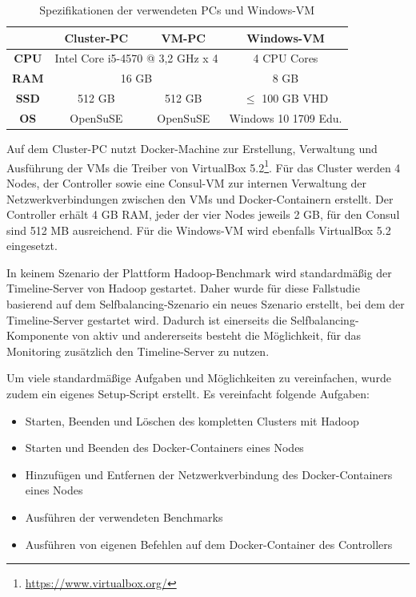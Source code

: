 \begin{table}
    \centering
    \begin{tabular}{|c|c|c|c|}
    	\hline
    	 \textbf{}   & \textbf{Cluster-PC} &         \textbf{VM-PC}          & \textbf{Windows-VM}  \\ \hline\hline
    	\textbf{CPU} & \multicolumn{2}{c|}{Intel Core i5-4570 @ 3,2 GHz x 4} &     4 CPU Cores      \\ \hline
    	\textbf{RAM} &              \multicolumn{2}{c|}{16 GB}               &         8 GB         \\ \hline
    	\textbf{SSD} &       512 GB        &             512 GB              &  $\leq$ 100 GB VHD   \\ \hline
    	\textbf{OS}  &      OpenSuSE       &            OpenSuSE             & Windows 10 1709 Edu. \\ \hline
    \end{tabular}
    \caption{Spezifikationen der verwendeten PCs und Windows-VM}
    \label{tab:pcSpecs}
\end{table}

Auf dem Cluster-PC nutzt Docker-Machine zur Erstellung, Verwaltung und Ausführung der VMs die Treiber von VirtualBox 5.2\footnote{\url{https://www.virtualbox.org/}}. Für das Cluster werden 4 Nodes, der Controller sowie eine Consul-VM zur internen Verwaltung der Netzwerkverbindungen zwischen den VMs und Docker-Containern erstellt. Der Controller erhält 4 GB RAM, jeder der vier Nodes jeweils 2 GB, für den Consul sind 512 MB ausreichend. Für die Windows-VM wird ebenfalls VirtualBox 5.2 eingesetzt.

In keinem Szenario der Plattform Hadoop-Benchmark wird standardmäßig der Timeline-Server von Hadoop gestartet. Daher wurde für diese Fallstudie basierend auf dem Selfbalancing-Szenario ein neues Szenario erstellt, bei dem der Timeline-Server gestartet wird. Dadurch ist einerseits die Selfbalancing-Komponente von \citeauthor{zhang2016} aktiv und andererseits besteht die Möglichkeit, für das Monitoring zusätzlich den Timeline-Server zu nutzen.

Um viele standardmäßige Aufgaben und Möglichkeiten zu vereinfachen, wurde zudem ein eigenes Setup-Script erstellt. Es vereinfacht folgende Aufgaben:

\begin{itemize}[noitemsep]
    \item Starten, Beenden und Löschen des kompletten Clusters mit Hadoop
    \item Starten und Beenden des Docker-Containers eines Nodes
    \item Hinzufügen und Entfernen der Netzwerkverbindung des Docker-Containers eines Nodes
    \item Ausführen der verwendeten Benchmarks
    \item Ausführen von eigenen Befehlen auf dem Docker-Container des Controllers
\end{itemize}

